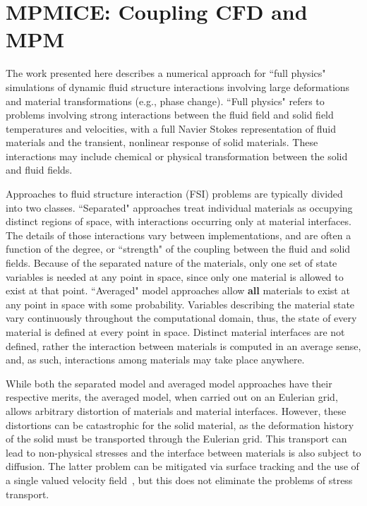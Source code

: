 \chapter{MPMICE: Coupling CFD and MPM} 

The work presented here describes a numerical approach for
``full physics" simulations of dynamic fluid structure interactions
involving large deformations and material transformations (e.g., phase
change).  ``Full physics" refers to problems involving strong
interactions between the fluid field and solid field temperatures and 
velocities, with a full Navier Stokes representation of fluid materials and the
transient, nonlinear response of solid materials.  These interactions
may include chemical or physical transformation between the solid
and fluid fields.

Approaches to fluid structure interaction (FSI) problems are typically
divided into two classes.  ``Separated" approaches treat individual materials
as occupying distinct regions of space, with interactions occurring only at
material interfaces.  The details of those interactions vary between
implementations, and are often a function of the degree, or ``strength" of the
coupling between the fluid and solid fields.  Because of the separated
nature of the materials, only one set of state variables is needed at any
point in space, since only one material is allowed to exist at that point.
``Averaged" model approaches allow {\bf all} materials to exist at any point in
space with some probability.    Variables describing the material state vary 
continuously throughout the computational domain, thus, the state of every 
material is defined at every point in space.  Distinct material interfaces are 
not defined, rather the interaction between materials is computed in an average 
sense, and, as such, interactions among materials may take place anywhere.

While both the separated model and averaged model approaches have their
respective merits, the averaged model, when carried out on an Eulerian grid,
allows arbitrary distortion of materials and material 
interfaces.  However, these distortions can be catastrophic for the solid 
material, as the deformation history of the solid must be transported through 
the Eulerian grid.  This transport can lead to non-physical stresses and the 
interface between materials is also subject to diffusion.  The latter problem 
can be mitigated via surface tracking and the use of a single valued 
velocity field~\cite{Benson1995,Benson1998}, but this does not eliminate the 
problems of stress transport.


